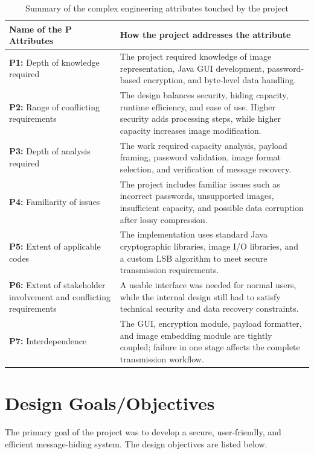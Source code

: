 \documentclass[12pt]{report}
\begin{document}
\begin{table}[htbp]
   \centering
    \caption{Summary of the complex engineering attributes touched by the project}
    \begin{tabular}{|p{6.0 cm}|p{8 cm}|}
    \toprule
        \textbf{Name of the P Attributes} & \textbf{How the project addresses the attribute}  \\
        \midrule
    \textbf{P1:} Depth of knowledge required  & The project required knowledge of image representation, Java GUI development, password-based encryption, and byte-level data handling. \\
      \hline
    \textbf{P2:} Range of conflicting requirements  & The design balances security, hiding capacity, runtime efficiency, and ease of use. Higher security adds processing steps, while higher capacity increases image modification. \\
      \hline
    \textbf{P3:} Depth of analysis required  & The work required capacity analysis, payload framing, password validation, image format selection, and verification of message recovery. \\
    \hline
    \textbf{P4:} Familiarity of issues  & The project includes familiar issues such as incorrect passwords, unsupported images, insufficient capacity, and possible data corruption after lossy compression. \\
    \hline
    \textbf{P5:} Extent of applicable codes  & The implementation uses standard Java cryptographic libraries, image I/O libraries, and a custom LSB algorithm to meet secure transmission requirements. \\
      \hline
    \textbf{P6:} Extent of stakeholder involvement and conflicting requirements  & A usable interface was needed for normal users, while the internal design still had to satisfy technical security and data recovery constraints. \\
      \hline
    \textbf{P7:} Interdependence  & The GUI, encryption module, payload formatter, and image embedding module are tightly coupled; failure in one stage affects the complete transmission workflow. \\
    \hline
    \end{tabular}
    \label{tab:IC}
\end{table}

\section{Design Goals/Objectives}
The primary goal of the project was to develop a secure, user-friendly, and efficient message-hiding system. The design objectives are listed below.
\end{document}
